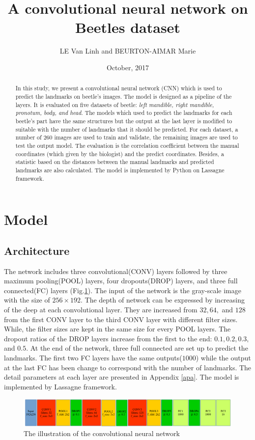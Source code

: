 \documentclass[12pt,a4paper]{article}
\begin{document}
\title{A convolutional neural network on Beetles dataset }
\author{LE Van Linh and BEURTON-AIMAR Marie}
\date{October, 2017}
\maketitle
\begin{abstract}
In this study, we present a convolutional neural network (CNN) which is used to predict the landmarks on beetle's images.  The model is designed as a pipeline of the layers. It is evaluated on five datasets of beetle: \textit{left mandible, right mandible, pronotum, body, and head}. The models which used to predict the landmarks for each beetle's part have the same structures but the output at the last layer is modified to suitable with the number of landmarks that it should be predicted. For each dataset, a number of $260$ images are used to train and validate, the remaining images are used to test the output model. The evaluation is the correlation coefficient between the manual coordinates (which given by the biologist) and the predict coordinates. Besides, a statistic based on the distances between the manual landmarks and predicted landmarks are also calculated. The model is implemented by Python on Lassagne framework\cite{lasagne}.
\end{abstract}

\section{Model}
\subsection{Architecture}
The network includes three convolutional(CONV) layers followed by three maximum pooling(POOL) layers, four dropouts(DROP) layers, and three full connected(FC) layers (Fig.\ref{pmodel}). The input of the network is the gray-scale image with the size of $256 \times 192$. The depth of network can be expressed by increasing of the deep at each convolutional layer. They are increased from $32, 64,$ and $128$ from the first CONV layer to the third CONV layer with different filter sizes. While, the filter sizes are kept in the same size for every POOL layers. The dropout ratios of the DROP layers increase from the first to the end: $0.1, 0.2, 0.3, $ and $0.5$. At the end of the network, three full connected are set up to predict the landmarks. The first two FC layers have the same outputs($1000$) while the output at the last FC has been change to correspond with the number of landmarks. The detail parameters at each layer are presented in Appendix \ref{apa}. The model is implemented by Lassagne framework\cite{lasagne}.
\begin{figure}[h!]
	\centering
	\includegraphics[scale=0.45]{images/model3_dropout}
	\caption{The illustration of the convolutional neural network}
	\label{pmodel}
\end{figure}
\end{document}
